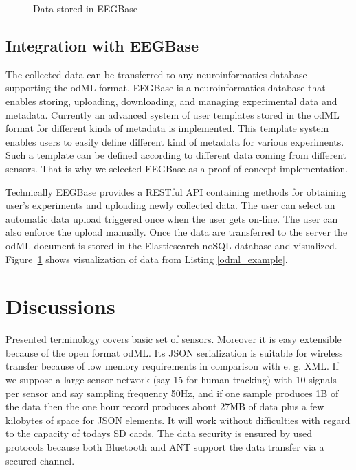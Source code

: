 \documentclass[a4paper,twoside]{article}
\begin{document}
\begin{figure}

  \centering
   {}
  \caption{Data stored in EEGBase}
  \label{fig:EEGBase}
 \end{figure}


\subsection{Integration with EEGBase}

The collected data can be transferred to any neuroinformatics database supporting the odML format.
EEGBase is a neuroinformatics database that enables storing, uploading, downloading, and managing experimental data and metadata. Currently an advanced system of user templates stored in the odML format for different kinds of metadata is implemented. This template system enables users to easily define different kind of metadata for various experiments. Such a template can be defined according to different data coming from different sensors. That is why we selected EEGBase as a proof-of-concept implementation.

Technically EEGBase provides a RESTful API containing methods for obtaining user's experiments and uploading newly collected data. The user can select an automatic data upload triggered once when the user gets on-line. The user can also enforce the upload manually. Once the data are transferred to the server the odML document is stored in the Elasticsearch noSQL database and visualized. Figure~\ref{fig:EEGBase} shows visualization of data from Listing \ref{odml_example}.


\section{Discussions}
Presented terminology covers basic set of sensors. Moreover it is easy extensible because of the open format odML. Its JSON serialization is suitable for wireless transfer because of low memory requirements in comparison with e. g. XML.  If we suppose a large sensor network (say 15 for human tracking) with 10 signals per sensor and say sampling frequency 50Hz, and if one sample produces 1B of the data then the one hour record produces about 27MB of data plus a few kilobytes of space for JSON elements. It will work without difficulties with regard to the capacity of todays SD cards. The data security is ensured by used protocols because both Bluetooth and ANT support the data transfer via a secured channel.
\end{document}
